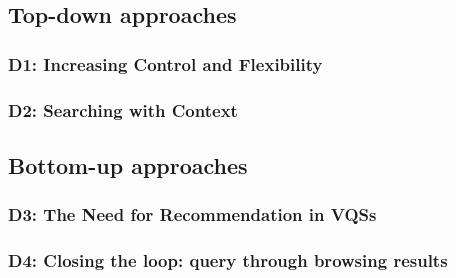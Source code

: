 \subsection{Top-down approaches}
  \subsubsection{D1: Increasing Control and Flexibility}
  \subsubsection{D2: Searching with Context}
\subsection{Bottom-up approaches}
  \subsubsection{D3: The Need for Recommendation in VQSs}
  \subsubsection{D4: Closing the loop: query through browsing results}
